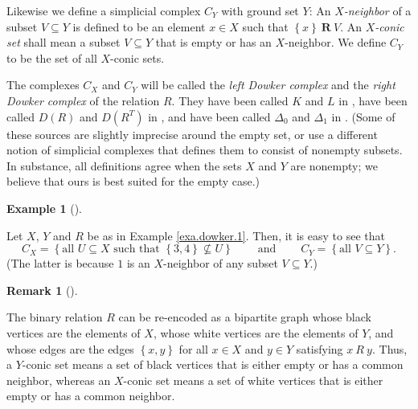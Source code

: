 \documentclass[numbers=enddot,12pt,final,onecolumn,notitlepage]{scrartcl}%
\theoremstyle{definition}
\newtheorem{remk}[theo]{Remark}
\newenvironment{remark}[1][]
{\begin{remk}[#1]\begin{leftbar}}
{\end{leftbar}\end{remk}}
\newtheorem{exam}[theo]{Example}
\newenvironment{example}[1][]
{\begin{exam}[#1]\begin{leftbar}}
{\end{leftbar}\end{exam}}
\begin{document}
Likewise we define a simplicial complex $C_{Y}$ with ground set $Y$: An
$X$\emph{-neighbor} of a subset $V\subseteq Y$ is defined to be an element
$x\in X$ such that $\left\{  x\right\}  \ \mathbf{R}\ V$. An $X$\emph{-conic
set} shall mean a subset $V\subseteq Y$ that is empty or has an $X$-neighbor.
We define $C_{Y}$ to be the set of all $X$-conic sets.

The complexes $C_{X}$ and $C_{Y}$ will be called the \emph{left Dowker
complex} and the \emph{right Dowker complex} of the relation $R$. They have
been called $K$ and $L$ in \cite[\S 1]{Dowker52}, have been called $D\left(
R\right)  $ and $D\left(  R^{T}\right)  $ in \cite{BruSal22}, and have been
called $\Delta_{0}$ and $\Delta_{1}$ in \cite[Theorem 10.9]{Bjorne95}.
(Some of these sources are slightly imprecise around the empty set, or use
a different notion of simplicial complexes that defines them to consist of
nonempty subsets. In substance, all definitions agree when the sets $X$
and $Y$ are nonempty; we believe that ours is best suited for the empty
case.)


\begin{example}
\label{exa.dowker.2}Let $X$, $Y$ and $R$ be as in Example \ref{exa.dowker.1}.
Then, it is easy to see that%
\[
C_{X}=\left\{  \text{all }U\subseteq X\text{ such that }\left\{  3,4\right\}
\not \subseteq U\right\}  \ \ \ \ \ \ \ \ \ \ \text{and}%
\ \ \ \ \ \ \ \ \ \ C_{Y}=\left\{  \text{all }V\subseteq Y\right\}  .
\]
(The latter is because $1$ is an $X$-neighbor of any subset $V\subseteq Y$.)
\end{example}

\begin{remark}
\label{rmk.bipar} The binary relation $R$ can be re-encoded as a bipartite
graph whose black vertices are the elements of $X$, whose white vertices are
the elements of $Y$, and whose edges are the edges $\left\{  x,y\right\}  $
for all $x\in X$ and $y\in Y$ satisfying $x\ R\ y$. Thus, a $Y$-conic set
means a set of black vertices that is either empty or has a common neighbor,
whereas an $X$-conic set means a set of white vertices that is either empty or
has a common neighbor.
\end{remark}
\end{document}
